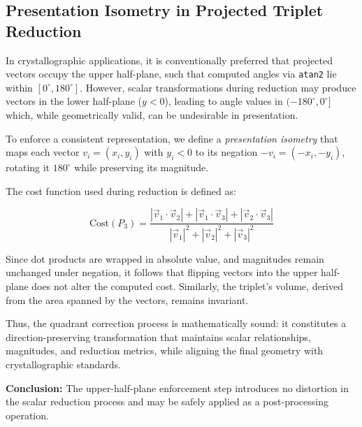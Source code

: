 \subsection{Presentation Isometry in Projected Triplet Reduction}

In crystallographic applications, it is conventionally preferred that projected vectors occupy the upper half-plane, such that computed angles via \texttt{atan2} lie within $[0^\circ, 180^\circ]$. However, scalar transformations during reduction may produce vectors in the lower half-plane ($y < 0$), leading to angle values in $(-180^\circ, 0^\circ]$ which, while geometrically valid, can be undesirable in presentation.

To enforce a consistent representation, we define a \emph{presentation isometry} that maps each vector $v_i = (x_i, y_i)$ with $y_i < 0$ to its negation $-v_i = (-x_i, -y_i)$, rotating it $180^\circ$ while preserving its magnitude.

The cost function used during reduction is defined as:


\[
\text{Cost}(P_3) = \frac{|\vec{v}_1 \cdot \vec{v}_2| + |\vec{v}_1 \cdot \vec{v}_3| + |\vec{v}_2 \cdot \vec{v}_3|}{|\vec{v}_1|^2 + |\vec{v}_2|^2 + |\vec{v}_3|^2}
\]



Since dot products are wrapped in absolute value, and magnitudes remain unchanged under negation, it follows that flipping vectors into the upper half-plane does not alter the computed cost. Similarly, the triplet's volume, derived from the area spanned by the vectors, remains invariant.

Thus, the quadrant correction process is mathematically sound: it constitutes a direction-preserving transformation that maintains scalar relationships, magnitudes, and reduction metrics, while aligning the final geometry with crystallographic standards.

\textbf{Conclusion:} The upper-half-plane enforcement step introduces no distortion in the scalar reduction process and may be safely applied as a post-processing operation.
